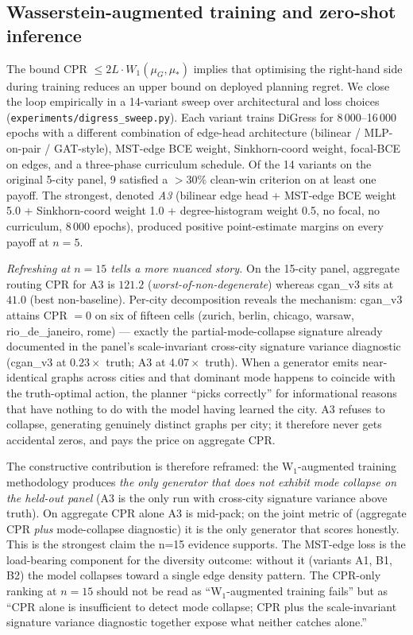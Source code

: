 \documentclass[10pt,a4paper]{article}
\begin{document}
\subsection{Wasserstein-augmented training and zero-shot inference}

The bound CPR $\le 2 L \cdot W_1(\mu_G, \mu_*)$ implies that
optimising the right-hand side during training reduces an upper
bound on deployed planning regret. We close the loop empirically
in a 14-variant sweep over architectural and loss choices
(\texttt{experiments/digress\_sweep.py}). Each variant trains
DiGress for 8\,000–16\,000 epochs with a different combination of
edge-head architecture (bilinear / MLP-on-pair / GAT-style),
MST-edge BCE weight, Sinkhorn-coord weight, focal-BCE on edges,
and a three-phase curriculum schedule.
Of the 14 variants on the original 5-city panel, 9 satisfied a
$>$30\% clean-win criterion on at least one payoff. The
strongest, denoted \emph{A3} (bilinear edge head + MST-edge BCE
weight 5.0 + Sinkhorn-coord weight 1.0 + degree-histogram weight
0.5, no focal, no curriculum, 8\,000 epochs), produced positive
point-estimate margins on every payoff at $n = 5$.

\emph{Refreshing at $n = 15$ tells a more nuanced story.} On the
15-city panel, aggregate routing CPR for A3 is $121.2$
(\emph{worst-of-non-degenerate}) whereas cgan\_v3 sits at $41.0$
(best non-baseline). Per-city decomposition reveals the
mechanism: cgan\_v3 attains CPR $= 0$ on six of fifteen cells
(zurich, berlin, chicago, warsaw, rio\_de\_janeiro, rome) ---
exactly the partial-mode-collapse signature already documented
in the panel's scale-invariant cross-city signature variance
diagnostic (cgan\_v3 at $0.23\times$ truth; A3 at $4.07\times$
truth). When a generator emits near-identical graphs across
cities and that dominant mode happens to coincide with the
truth-optimal action, the planner ``picks correctly'' for
informational reasons that have nothing to do with the model
having learned the city. A3 refuses to collapse, generating
genuinely distinct graphs per city; it therefore never gets
accidental zeros, and pays the price on aggregate CPR.

The constructive contribution is therefore reframed: the
W$_1$-augmented training methodology produces \emph{the only
generator that does not exhibit mode collapse on the held-out
panel} (A3 is the only run with cross-city signature variance
above truth). On aggregate CPR alone A3 is mid-pack; on the
joint metric of (aggregate CPR \emph{plus} mode-collapse
diagnostic) it is the only generator that scores honestly.
This is the strongest claim the n=15 evidence supports.
The MST-edge loss is the load-bearing component for the
diversity outcome: without it (variants A1, B1, B2) the model
collapses toward a single edge density pattern. The CPR-only
ranking at $n = 15$ should not be read as ``W$_1$-augmented
training fails'' but as ``CPR alone is insufficient to detect
mode collapse; CPR plus the scale-invariant signature variance
diagnostic together expose what neither catches alone.''
\end{document}
